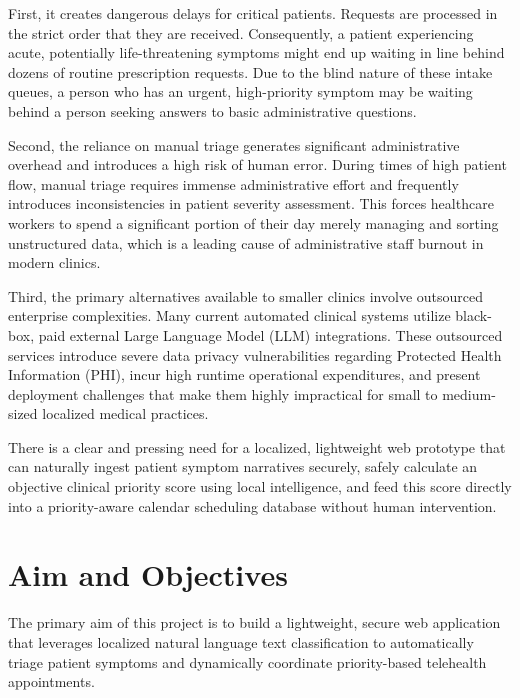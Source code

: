 \documentclass[12pt,a4paper]{report}
\begin{document}
First, it creates dangerous delays for critical patients. Requests are processed in the strict order that they are received. Consequently, a patient experiencing acute, potentially life-threatening symptoms might end up waiting in line behind dozens of routine prescription requests. Due to the blind nature of these intake queues, a person who has an urgent, high-priority symptom may be waiting behind a person seeking answers to basic administrative questions.

Second, the reliance on manual triage generates significant administrative overhead and introduces a high risk of human error. During times of high patient flow, manual triage requires immense administrative effort and frequently introduces inconsistencies in patient severity assessment. This forces healthcare workers to spend a significant portion of their day merely managing and sorting unstructured data, which is a leading cause of administrative staff burnout in modern clinics.

Third, the primary alternatives available to smaller clinics involve outsourced enterprise complexities. Many current automated clinical systems utilize black-box, paid external Large Language Model (LLM) integrations. These outsourced services introduce severe data privacy vulnerabilities regarding Protected Health Information (PHI), incur high runtime operational expenditures, and present deployment challenges that make them highly impractical for small to medium-sized localized medical practices.

There is a clear and pressing need for a localized, lightweight web prototype that can naturally ingest patient symptom narratives securely, safely calculate an objective clinical priority score using local intelligence, and feed this score directly into a priority-aware calendar scheduling database without human intervention.

\section{Aim and Objectives}
The primary aim of this project is to build a lightweight, secure web application that leverages localized natural language text classification to automatically triage patient symptoms and dynamically coordinate priority-based telehealth appointments. 
\end{document}
